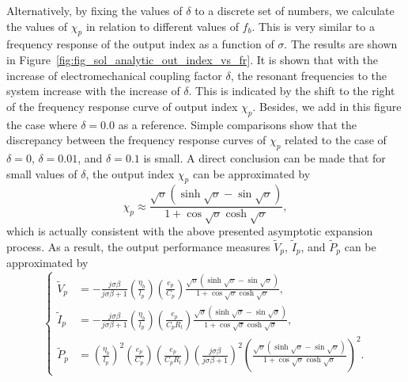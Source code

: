 \documentclass{svjour3}                     %
\begin{document}
Alternatively, by fixing the values of $\delta$ to a discrete set of numbers, we calculate the values of $\chi_p$ in relation to different values of $f_b$. This is very similar to a frequency response of the output index as a function of $\sigma$. The results are shown in Figure~\ref{fig:fig_sol_analytic_out_index_vs_fr}. It is shown that with the increase of electromechanical coupling factor $\delta$, the resonant frequencies to the system increase with the increase of $\delta$. This is indicated by the shift to the right of the frequency response curve of output index $\chi_p$. Besides, we add in this figure the case where $\delta = 0.0$ as a reference. Simple comparisons show that the discrepancy between the frequency response curves of $\chi_p$ related to the case of $\delta = 0$, $\delta=0.01$, and $\delta = 0.1$ is small. A direct conclusion can be made that for small values of $\delta$, the output index $\chi_p$ can be approximated by 
\begin{equation}
    \chi_p \approx \frac{ \sqrt{\sigma} \left( \sinh\sqrt{\sigma} - \sin\sqrt{\sigma} \right) }{ 1 + \cos\sqrt{\sigma } \cosh\sqrt{\sigma } },
\end{equation}
which is actually consistent with the above presented asymptotic expansion process. As a result, the output performance measures $\tilde{V}_p$, $\tilde{I}_p$, and $\tilde{P}_p$ can be approximated by 
\begin{equation}
    \left\{\begin{aligned}
        \tilde{V}_p &= - \frac{j \sigma \beta}{j \sigma \beta + 1} \left(\frac{\eta_b}{l_p}\right) \left(\frac{e_p}{C_p}\right) \frac{ \sqrt{\sigma} \left( \sinh\sqrt{\sigma} - \sin\sqrt{\sigma} \right) }{ 1 + \cos\sqrt{\sigma } \cosh\sqrt{\sigma } } , \\
        \tilde{I}_p &= - \frac{ j \sigma \beta } {j \sigma \beta + 1} \left( \frac{\eta_b}{l_p} \right) \left( \frac{e_p}{C_p R_l} \right) \frac{ \sqrt{\sigma} \left( \sinh\sqrt{\sigma} - \sin\sqrt{\sigma} \right) }{ 1 + \cos\sqrt{\sigma } \cosh\sqrt{\sigma } }, \\
        \tilde{P}_p &= \left(\frac{\eta_b}{l_p}\right)^2 \left(\frac{e_p}{C_p}\right) \left( \frac{e_p}{C_p R_l} \right) \left( \frac{ j \sigma \beta}{ j \sigma \beta + 1 } \right)^2 \left( \frac{ \sqrt{\sigma} \left( \sinh\sqrt{\sigma} - \sin\sqrt{\sigma} \right) }{ 1 + \cos\sqrt{\sigma } \cosh\sqrt{\sigma } } \right)^2.
    \end{aligned}\right.
    \label{eq:eq_peh_perfs_compact_form_approx}
\end{equation}
\end{document}
